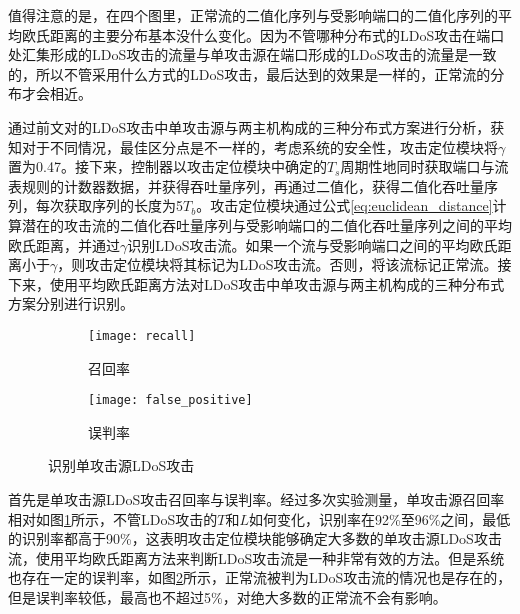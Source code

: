 值得注意的是，在四个图里，正常流的二值化序列与受影响端口的二值化序列的平均欧氏距离的主要分布基本没什么变化。因为不管哪种分布式的LDoS攻击在端口处汇集形成的LDoS攻击的流量与单攻击源在端口形成的LDoS攻击的流量是一致的，所以不管采用什么方式的LDoS攻击，最后达到的效果是一样的，正常流的分布才会相近。

通过前文对的LDoS攻击中单攻击源与两主机构成的三种分布式方案进行分析，获知对于不同情况，最佳区分点是不一样的，考虑系统的安全性，攻击定位模块将$\gamma$置为0.47。接下来，控制器以攻击定位模块中确定的$T_s$周期性地同时获取端口与流表规则的计数器数据，并获得吞吐量序列，再通过二值化，获得二值化吞吐量序列，每次获取序列的长度为5$T_b$。攻击定位模块通过公式\ref{eq:euclidean_distance}计算潜在的攻击流的二值化吞吐量序列与受影响端口的二值化吞吐量序列之间的平均欧氏距离，并通过$\gamma$识别LDoS攻击流。如果一个流与受影响端口之间的平均欧氏距离小于$\gamma$，则攻击定位模块将其标记为LDoS攻击流。否则，将该流标记正常流。接下来，使用平均欧氏距离方法对LDoS攻击中单攻击源与两主机构成的三种分布式方案分别进行识别。


\begin{figure}
    \begin{subfigure}{.49\textwidth}
        \centering
        \texttt{[image: recall]}
        \caption{召回率}
        \label{fig:recall}
    \end{subfigure}
    \begin{subfigure}{.49\textwidth}
        \centering
        \texttt{[image: false\_positive]}
        \caption{误判率}
        \label{fig:false-positive}
    \end{subfigure}
    \caption{识别单攻击源LDoS攻击}
    \label{fig:accuracy-single}
\end{figure}

首先是单攻击源LDoS攻击召回率与误判率。经过多次实验测量，单攻击源召回率相对如图\ref{fig:recall}所示，不管LDoS攻击的$T$和$L$如何变化，识别率在92\%至96\%之间，最低的识别率都高于90\%，这表明攻击定位模块能够确定大多数的单攻击源LDoS攻击流，使用平均欧氏距离方法来判断LDoS攻击流是一种非常有效的方法。但是系统也存在一定的误判率，如图\ref{fig:false-positive}所示，正常流被判为LDoS攻击流的情况也是存在的，但是误判率较低，最高也不超过5\%，对绝大多数的正常流不会有影响。


